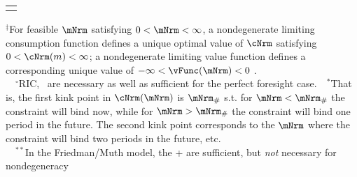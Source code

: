 \begin{table}
{\begin{tabular}{|l|l|l|}
        \\ \hline \multicolumn{3}{c}{}
      \end{tabular}
    } %

    \settowidth\TableWidth{\usebox{\TblBox}}
    \savebox{\TblShrunkBox}{
      \settowidth{\TblShrunk}{\usebox{\TblBox}}
      \resizebox{\textwidth}{!}{\begin{minipage}{\TblShrunk}
          \usebox{\TblBox}
        \end{minipage}}
    }

    \usebox{\TblShrunkBox}


    \parbox{\textwidth}{\raggedright \footnotesize         $^{\ddagger}$For feasible $\mNrm$ satisfying $0 < \mNrm < \infty$, a nondegenerate limiting consumption function defines a unique optimal value of $\cNrm$ satisfying $0 < \cNrm(m) < \infty$; a nondegenerate limiting value function defines a corresponding unique value of $-\infty < \vFunc(\mNrm) < 0$ .\\
      ~~$^{\circ}$RIC, \FHWC~are necessary as well as sufficient for the perfect foresight case.~~$^{\ast}$That is, the first kink point in $\cNrm(\mNrm)$ is $\mNrm_{\#}$ s.t. for $\mNrm < \mNrm_{\#}$ the constraint will bind now, while for $\mNrm > \mNrm_{\#}$ the constraint will bind one period in the future.  The second kink point corresponds to the $\mNrm$ where the constraint will bind two periods in the future, etc.\\
      ~~$^{\ast\ast}$In the Friedman/Muth model, the {\RIC}+{\FHWC} are sufficient, but \textit{not} necessary for nondegeneracy}
  \end{table}

